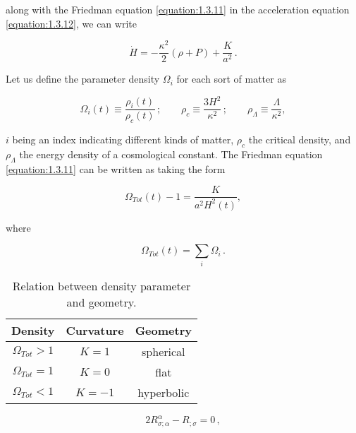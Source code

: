 along with the Friedman equation \eqref{equation:1.3.11} in the acceleration equation \eqref{equation:1.3.12}, we can write  

\begin{equation}
\dot{H}=-\frac{\kappa^2}{2} (\rho+P)+\frac{K}{a^2} \, .
\label{equation:1.3.14}
\end{equation}
 
Let us define the parameter density $ \Omega_i $ for each sort of matter as 
 
\begin{equation}
\Omega_i (t)\equiv \frac{\rho_i(t)}{\rho_c(t)}\, ; \qquad \rho_c \equiv \frac{3H^2}{\kappa^2} \, ; \qquad \rho_{\Lambda} \equiv \frac{\Lambda}{\kappa^2} , 
\label{equation:1.3.15}
\end{equation}

$ i $ being an index indicating different kinds of matter, $ \rho_c $ the critical density, and $ \rho_{\Lambda} $ the energy density of a cosmological constant. The Friedman equation \eqref{equation:1.3.11} can be written as taking the form 

\begin{equation}
\Omega_{Tot}(t)-1=\frac{K}{a^2H^2(t)},
\label{equation:1.3.16}
\end{equation}

where

\begin{equation}
\Omega_{Tot} (t) = \sum_i \Omega_i \, .
\label{equation:1.3.17}
\end{equation}


\begin{table}[h!]
\centering
\begin{tabular}{|c|c|c|}
\hline
Density    & Curvature & Geometry \\ \hline
$\Omega_{Tot}>1$   & $K=1$     & spherical \\ \hline
$ \Omega_{Tot}=1 $ & $ K=0 $   & flat  \\ \hline
$ \Omega_{Tot}<1 $ & $ K=-1 $  & hyperbolic \\ \hline
\end{tabular}
\caption{Relation between density parameter and geometry.}
\label{table:1.3.1}
\end{table}

\begin{equation}
2R^{\alpha}_{\sigma;\alpha}-R_{;\sigma}=0 \, ,
\label{equation:1.3.18}
\end{equation}


